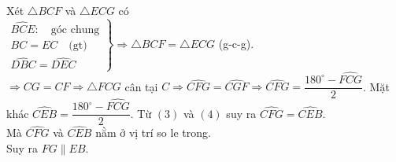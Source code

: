 \begin{vn}
{\begin{enumerate}
{
}
Xét $\triangle BCF$ và $\triangle ECG$ có \\
$\left. 
\begin{array}{l} 
\widehat{BCE}: \quad \text{góc chung}\\
BC=EC \quad \text{(gt)}\\
\widehat{DBC}=\widehat{DEC}
\end{array} 
\right\} \Rightarrow \triangle BCF = \triangle ECG$ (g-c-g).\\
$\Rightarrow CG=CF\Rightarrow \triangle FCG$ cân tại $C\Rightarrow \widehat{CFG}=\widehat{CGF}\Rightarrow \widehat{CFG}=\dfrac{180^\circ -\widehat{FCG}}{2}$.  
Mặt khác $\widehat{CEB}=\dfrac{180^\circ -\widehat{FCG}}{2}$.  
Từ $(3)$ và $(4)$ suy ra $\widehat{CFG}=\widehat{CEB}$.\\
Mà $\widehat{CFG}$ và $\widehat{CEB}$ nằm ở vị trí so le trong.\\
Suy ra $FG \parallel EB$. 
\end{enumerate}
}
\end{vn}

